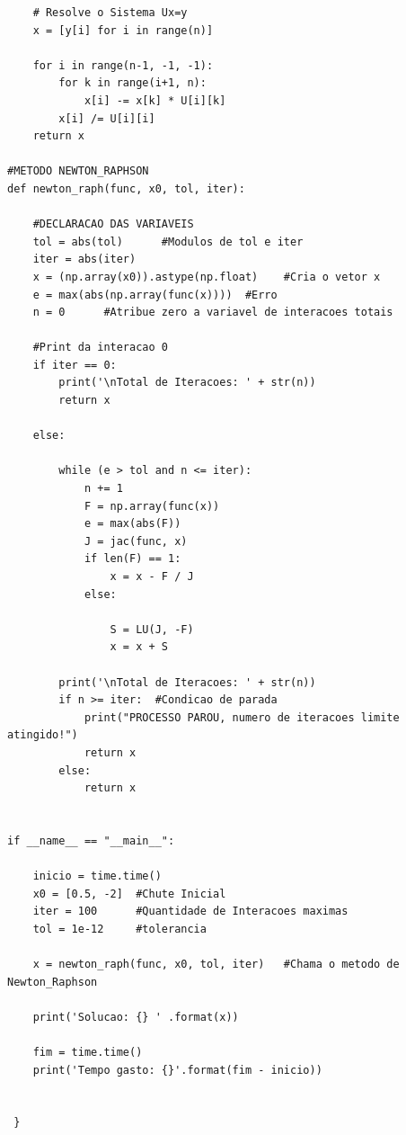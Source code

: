 \documentclass[a4paper, 12pt, openright, oneside]{article}
\begin{document}
\begin{lstlisting}
    # Resolve o Sistema Ux=y
    x = [y[i] for i in range(n)]

    for i in range(n-1, -1, -1):
        for k in range(i+1, n):
            x[i] -= x[k] * U[i][k]
        x[i] /= U[i][i]
    return x

#METODO NEWTON_RAPHSON
def newton_raph(func, x0, tol, iter):

    #DECLARACAO DAS VARIAVEIS
    tol = abs(tol)      #Modulos de tol e iter
    iter = abs(iter)
    x = (np.array(x0)).astype(np.float)    #Cria o vetor x
    e = max(abs(np.array(func(x))))  #Erro
    n = 0      #Atribue zero a variavel de interacoes totais

    #Print da interacao 0
    if iter == 0:
        print('\nTotal de Iteracoes: ' + str(n))
        return x

    else:

        while (e > tol and n <= iter):
            n += 1
            F = np.array(func(x))
            e = max(abs(F))
            J = jac(func, x)
            if len(F) == 1:
                x = x - F / J
            else:

                S = LU(J, -F)
                x = x + S

        print('\nTotal de Iteracoes: ' + str(n))
        if n >= iter:  #Condicao de parada
            print("PROCESSO PAROU, numero de iteracoes limite atingido!")
            return x
        else:
            return x


if __name__ == "__main__":

    inicio = time.time()
    x0 = [0.5, -2]  #Chute Inicial
    iter = 100      #Quantidade de Interacoes maximas
    tol = 1e-12     #tolerancia

    x = newton_raph(func, x0, tol, iter)   #Chama o metodo de Newton_Raphson

    print('Solucao: {} ' .format(x))

    fim = time.time()
    print('Tempo gasto: {}'.format(fim - inicio))


 } \end{lstlisting}
\end{document}
